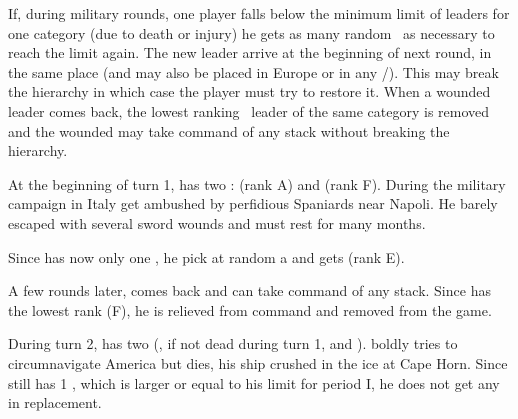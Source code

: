 \bparag If, during military rounds, one player falls below the minimum limit
of leaders for one category (due to death or injury) he gets as many random
\anonyme\ as necessary to reach the limit again.
\bparag The new leader arrive at the beginning of next round, in the same
place (\LeaderE and \LeaderC may also be placed in Europe or in any
\COL/\TP).
\bparag This may break the hierarchy in which case the player must try to
restore it.
\bparag When a wounded leader comes back, the lowest ranking \anonyme\ leader
of the same category is removed and the wounded may take command of any stack
without breaking the hierarchy.

\begin{exemple}
  At the beginning of turn 1, \FRA has two \LeaderG :  (rank A)
  and  (rank F). During the military campaign in Italy 
  get ambushed by perfidious Spaniards near Napoli. He barely escaped with
  several sword wounds and must rest for many months.

  Since \FRA has now only one \LeaderG, he pick at random a \anonyme\LeaderG
  and gets  (rank E).

  A few rounds later,  comes back and can take command of any
  stack. Since  has the lowest rank (F), he is relieved from command
  and removed from the game.

  \smallskip

  During turn 2, \POR has two \LeaderE (, if not dead during turn
  1, and ).  boldly tries to circumnavigate
  America but dies, his ship crushed in the ice at Cape Horn. Since \POR still
  has 1 \LeaderE, which is larger or equal to his limit for period I, he does
  not get any \anonyme\LeaderE in replacement.
\end{exemple}



